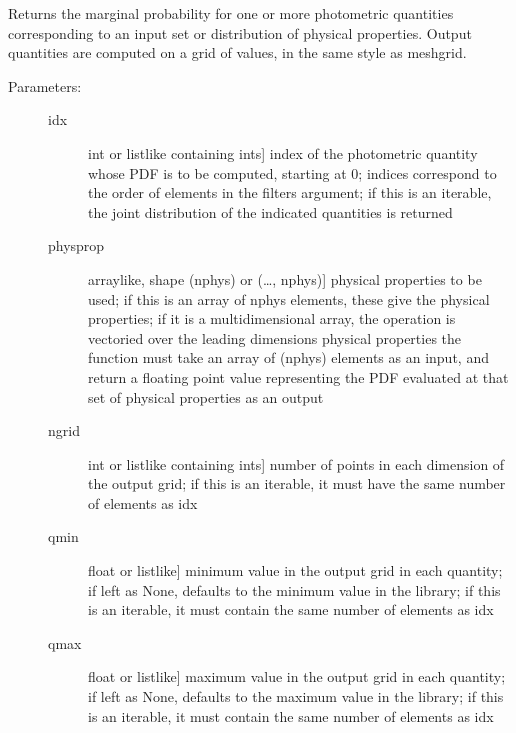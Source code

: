 \documentclass[letterpaper,10pt,english]{sphinxmanual}
\begin{document}
\begin{fulllineitems}
\begin{fulllineitems}
\begin{description}
\end{description}

\end{fulllineitems}


\begin{fulllineitems}
\label{\detokenize{cluster_slug:slugpy.cluster_slug.cluster_slug.mpdf_phot}}
Returns the marginal probability for one or more photometric
quantities corresponding to an input set or distribution of
physical properties. Output quantities are computed on a grid of
values, in the same style as meshgrid.
\begin{description}
\item[{Parameters:}] \leavevmode\begin{description}
\item[{idx}] \leavevmode{[}int or listlike containing ints{]}
index of the photometric quantity whose PDF is to be
computed, starting at 0; indices correspond to the order
of elements in the filters argument; if this is an
iterable, the joint distribution of the indicated
quantities is returned

\item[{physprop}] \leavevmode{[}arraylike, shape (nphys) or (…, nphys){]}
physical properties to be used; if this is an array of
nphys elements, these give the physical properties; if
it is a multidimensional array, the operation is
vectoried over the leading dimensions
physical properties \textendash{} the function must take an array
of (nphys) elements as an input, and return a floating
point value representing the PDF evaluated at that set
of physical properties as an output

\item[{ngrid}] \leavevmode{[}int or listlike containing ints{]}
number of points in each dimension of the output grid;
if this is an iterable, it must have the same number of
elements as idx

\item[{qmin}] \leavevmode{[}float or listlike{]}
minimum value in the output grid in each quantity; if
left as None, defaults to the minimum value in the
library; if this is an iterable, it must contain the
same number of elements as idx

\item[{qmax}] \leavevmode{[}float or listlike{]}
maximum value in the output grid in each quantity; if
left as None, defaults to the maximum value in the
library; if this is an iterable, it must contain the
same number of elements as idx


\end{description}
\end{description}
\end{fulllineitems}
\end{fulllineitems}
\end{document}
